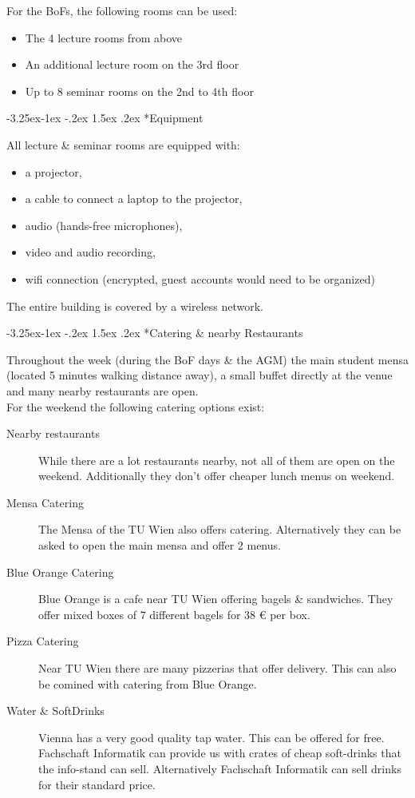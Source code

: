 \documentclass[10pt,a4paper]{article}
\makeatletter
\renewcommand\subsubsection{%
\@startsection{subsubsection}{2}{\z@}%
              {-3.25ex\@plus -1ex \@minus -.2ex}%
              {1.5ex \@plus .2ex}%
              {\color{kdedarker}\sffamily\large\bfseries}}
\makeatother
\begin{document}
For the BoFs, the following rooms can be used:\\
\begin{itemize}
	\item The 4 lecture rooms from above
	\item An additional lecture room on the 3rd floor
	\item Up to 8 seminar rooms on the 2nd to 4th floor
\end{itemize}

\subsubsection*{Equipment}
All lecture \& seminar rooms are equipped with:
\begin{itemize}
	\item a projector,
	\item a cable to connect a laptop to the projector,
	\item audio (hands-free microphones),
	\item video and audio recording,
	\item wifi connection (encrypted, guest accounts would need to be organized)
\end{itemize}

The entire building is covered by a wireless network.

\subsubsection*{Catering \& nearby Restaurants}
Throughout the week (during the BoF days \& the AGM) the main student mensa (located 5 minutes walking distance away), a small buffet directly at the venue and many nearby restaurants are open.\\
For the weekend the following catering options exist:
\begin{description}
\item[\color{kdedarker} Nearby restaurants] While there are a lot restaurants nearby, not all of them are open on the weekend. Additionally they don't offer cheaper lunch menus on weekend.
\item[\color{kdedarker} Mensa Catering] The Mensa of the TU Wien also offers catering. Alternatively they can be asked to open the main mensa and offer 2 menus.
\item[\color{kdedarker} Blue Orange Catering] Blue Orange is a cafe near TU Wien offering bagels \& sandwiches. They offer mixed boxes of 7 different bagels for 38 \euro{} per box.
\item[\color{kdedarker} Pizza Catering] Near TU Wien there are many pizzerias that offer delivery. This can also be comined with catering from Blue Orange.
\item[\color{kdedarker} Water \& SoftDrinks] Vienna has a very good quality tap water. This can be offered for free. Fachschaft Informatik can provide us with crates of cheap soft-drinks that the info-stand can sell. Alternatively Fachschaft Informatik can sell drinks for their standard price.
\end{description}
\end{document}
